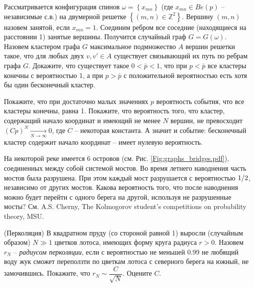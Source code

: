  
\begin{problem} 
Рассматривается конфигурация спинов $\omega =\left\{x_{mn} \right\}$ (где $x_{mn} \in Be(p) $ -- независимые с.в.) на двумерной решетке $\left\{(m,n) \in {\mathbb Z}^{2} \right\}$. Вершину $(m,n)$ назовем занятой, если $x_{mn} =1$. Соединим ребром все соседние (находящиеся на расстоянии 1) занятые вершины. Получится случайный граф $G=G\left(\omega \right)$. Назовем кластером графа $G$ максимальное подмножество $A$ вершин решетки такое, что для любых двух $v,v'\in A$ существует связывающий их путь по ребрам графа $G$. Докажите, что существует такое $0<\bar{p}<1$, что при $p<\bar{p}$ все кластеры конечны с вероятностью 1, а при $p>\bar{p}$ с положительной вероятностью есть хотя бы один бесконечный кластер.
 
 
\begin{ordre}
Покажите, что при достаточно малых значениях $p$ вероятность события, что все кластеры конечны, равна 1. Покажите, что вероятность того, что кластер, содержащий начало координат и имеющий не менее $N$ вершин, не превосходит $\left(Cp\right)^{N} \mathop{\to }\limits_{N\to \infty } 0$, где $C$ -- некоторая константа. А значит и событие: бесконечный кластер содержит начало координат -- имеет нулевую вероятность.
\end{ordre}
 
\end{problem}

\begin{problem}

На некоторой реке имеется 6 островов (см. Рис. \ref{Fig:graphs_bridges.pdf}), соединенных между собой системой мостов. Во время летнего наводнения часть мостов была разрушена. При этом каждый мост разрушается с вероятностью ${1\mathord{\left/ {\vphantom {1 2}} \right. \kern-\nulldelimiterspace} 2} $, независимо от других мостов. Какова вероятность того, что после наводнения можно будет перейти с одного берега на другой, используя не разрушенные мосты? См. A.S. Cherny, The Kolmogorov student's competitions on probability theory, MSU.


\end{problem}


\begin{problem}\Star(Перколяция)
В квадратном пруду (со стороной равной 1) 
выросли (случайным образом) $N\gg 1$ цветков лотоса, имеющих форму круга 
радиуса $r>0$. Назовем $r_N $ -- \textit{радиусом перколяции}, если с вероятностью не меньшей 0.99 не 
любящий воду жук сможет переползти по цветкам лотоса с северного берега на 
южный, не замочившись. Покажите, что $r_N \sim \dfrac{C}{\sqrt{N}}$. Оцените $C$.



\end{problem}

